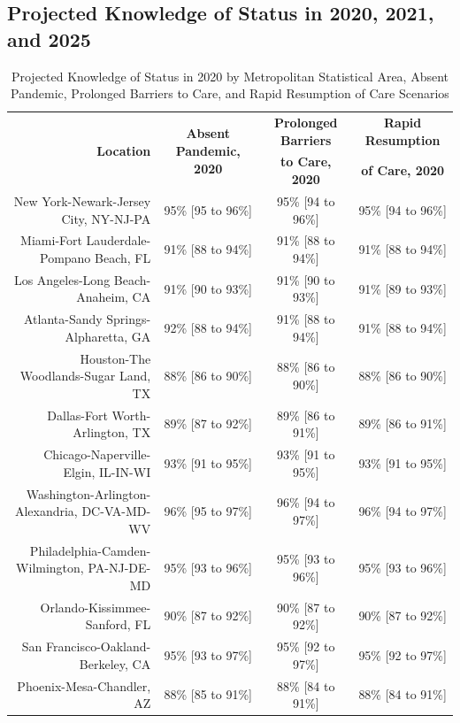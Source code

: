 \documentclass{article}
\begin{document}

\subsection{Projected Knowledge of Status in 2020, 2021, and 2025}

\begin{table}[H]
	\caption{Projected Knowledge of Status in 2020 by Metropolitan Statistical Area, Absent Pandemic, Prolonged Barriers to Care, and Rapid Resumption of Care Scenarios}
	\footnotesize
	\begin{tabular}{|r|c|c|c|}
		\hline
		\multirow{2}{*}{\textbf{Location}} & \multirow{2}{*}{\textbf{Absent Pandemic, 2020}} & \textbf{Prolonged Barriers} & \textbf{Rapid Resumption}\\
		&  & \textbf{to Care, 2020} & \textbf{of Care, 2020}\\
		\hline\hline
		New York-Newark-Jersey City, NY-NJ-PA & 95\% [95 to 96\%] & 95\% [94 to 96\%] & 95\% [94 to 96\%]\\
		Miami-Fort Lauderdale-Pompano Beach, FL & 91\% [88 to 94\%] & 91\% [88 to 94\%] & 91\% [88 to 94\%]\\
		Los Angeles-Long Beach-Anaheim, CA & 91\% [90 to 93\%] & 91\% [90 to 93\%] & 91\% [89 to 93\%]\\
		Atlanta-Sandy Springs-Alpharetta, GA & 92\% [88 to 94\%] & 91\% [88 to 94\%] & 91\% [88 to 94\%]\\
		Houston-The Woodlands-Sugar Land, TX & 88\% [86 to 90\%] & 88\% [86 to 90\%] & 88\% [86 to 90\%]\\
		Dallas-Fort Worth-Arlington, TX & 89\% [87 to 92\%] & 89\% [86 to 91\%] & 89\% [86 to 91\%]\\
		Chicago-Naperville-Elgin, IL-IN-WI & 93\% [91 to 95\%] & 93\% [91 to 95\%] & 93\% [91 to 95\%]\\
		Washington-Arlington-Alexandria, DC-VA-MD-WV & 96\% [95 to 97\%] & 96\% [94 to 97\%] & 96\% [94 to 97\%]\\
		Philadelphia-Camden-Wilmington, PA-NJ-DE-MD & 95\% [93 to 96\%] & 95\% [93 to 96\%] & 95\% [93 to 96\%]\\
		Orlando-Kissimmee-Sanford, FL & 90\% [87 to 92\%] & 90\% [87 to 92\%] & 90\% [87 to 92\%]\\
		San Francisco-Oakland-Berkeley, CA & 95\% [93 to 97\%] & 95\% [92 to 97\%] & 95\% [92 to 97\%]\\
		Phoenix-Mesa-Chandler, AZ & 88\% [85 to 91\%] & 88\% [84 to 91\%] & 88\% [84 to 91\%]\\

\end{tabular}
\end{table}
\end{document}
